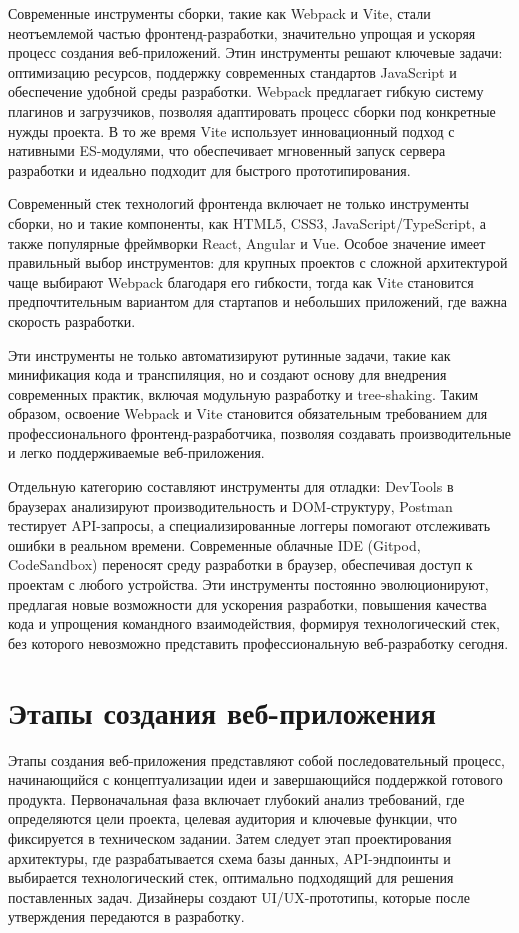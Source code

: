 \documentclass[referat]{SCWorks}
\begin{document}
Современные инструменты сборки, такие как Webpack и Vite, стали неотъемлемой частью фронтенд-разработки, значительно упрощая и ускоряя процесс создания веб-приложений. Этин инструменты решают ключевые задачи: оптимизацию ресурсов, поддержку современных стандартов JavaScript и обеспечение удобной среды разработки.\cite{mdn_web_docs} Webpack предлагает гибкую систему плагинов и загрузчиков, позволяя адаптировать процесс сборки под конкретные нужды проекта.\cite{frontend_development} В то же время Vite использует инновационный подход с нативными ES-модулями, что обеспечивает мгновенный запуск сервера разработки и идеально подходит для быстрого прототипирования.\cite{web_dev_2024}

Современный стек технологий фронтенда включает не только инструменты сборки, но и такие компоненты, как HTML5, CSS3, JavaScript/TypeScript, а также популярные фреймворки React, Angular и Vue. Особое значение имеет правильный выбор инструментов: для крупных проектов с сложной архитектурой чаще выбирают Webpack благодаря его гибкости, тогда как Vite становится предпочтительным вариантом для стартапов и небольших приложений, где важна скорость разработки.

Эти инструменты не только автоматизируют рутинные задачи, такие как минификация кода и транспиляция, но и создают основу для внедрения современных практик, включая модульную разработку и tree-shaking. Таким образом, освоение Webpack и Vite становится обязательным требованием для профессионального фронтенд-разработчика, позволяя создавать производительные и легко поддерживаемые веб-приложения.

Отдельную категорию составляют инструменты для отладки: DevTools в браузерах анализируют производительность и DOM-структуру, Postman тестирует API-запросы, а специализированные логгеры помогают отслеживать ошибки в реальном времени. Современные облачные IDE (Gitpod, CodeSandbox) переносят среду разработки в браузер, обеспечивая доступ к проектам с любого устройства. Эти инструменты постоянно эволюционируют, предлагая новые возможности для ускорения разработки, повышения качества кода и упрощения командного взаимодействия, формируя технологический стек, без которого невозможно представить профессиональную веб-разработку сегодня.\cite{mdn_web_docs}

\section{Этапы создания веб-приложения}

Этапы создания веб-приложения представляют собой последовательный процесс, начинающийся с концептуализации идеи и завершающийся поддержкой готового продукта. Первоначальная фаза включает глубокий анализ требований, где определяются цели проекта, целевая аудитория и ключевые функции, что фиксируется в техническом задании. Затем следует этап проектирования архитектуры, где разрабатывается схема базы данных, API-эндпоинты и выбирается технологический стек, оптимально подходящий для решения поставленных задач. Дизайнеры создают UI/UX-прототипы, которые после утверждения передаются в разработку.\cite{web_architecture}
\end{document}
